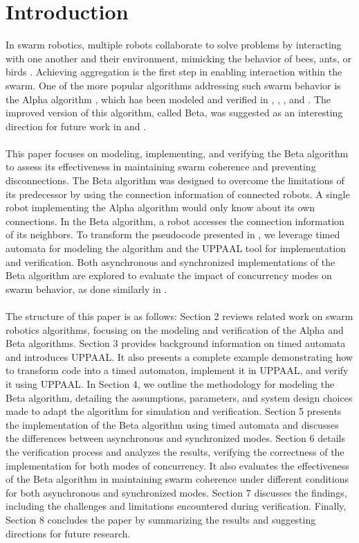\section{Introduction}
In swarm robotics, multiple robots collaborate to solve problems by interacting with one another and their environment, mimicking the behavior of bees, ants, or birds \cite{Shranz2020}. Achieving aggregation is the first step in enabling interaction within the swarm. One of the more popular algorithms addressing such swarm behavior is the Alpha algorithm \cite{Nembrini2002}, which has been modeled and verified in \cite{Winfield2005}, \cite{Sheshkalani2018}, \cite{Dixon2011}, and \cite{Dixon2015}. The improved version of this algorithm, called Beta, was suggested as an interesting direction for future work in \cite{Dixon2011} and \cite{Dixon2015}.
\\\\
This paper focuses on modeling, implementing, and verifying the Beta algorithm to assess its effectiveness in maintaining swarm coherence and preventing disconnections. The Beta algorithm was designed to overcome the limitations of its predecessor by using the connection information of connected robots. A single robot implementing the Alpha algorithm would only know about its own connections. In the Beta algorithm, a robot accesses the connection information of its neighbors. To transform the pseudocode presented in \cite{Nembrini2002}, we leverage timed automata for modeling the algorithm and the UPPAAL tool for implementation and verification. Both asynchronous and synchronized implementations of the Beta algorithm are explored to evaluate the impact of concurrency modes on swarm behavior, as done similarly in \cite{Dixon2011}.
\\\\
The structure of this paper is as follows: Section 2 reviews related work on swarm robotics algorithms, focusing on the modeling and verification of the Alpha and Beta algorithms. Section 3 provides background information on timed automata and introduces UPPAAL. It also presents a complete example demonstrating how to transform code into a timed automaton, implement it in UPPAAL, and verify it using UPPAAL. In Section 4, we outline the methodology for modeling the Beta algorithm, detailing the assumptions, parameters, and system design choices made to adapt the algorithm for simulation and verification. Section 5 presents the implementation of the Beta algorithm using timed automata and discusses the differences between asynchronous and synchronized modes. Section 6 details the verification process and analyzes the results, verifying the correctness of the implementation for both modes of concurrency. It also evaluates the effectiveness of the Beta algorithm in maintaining swarm coherence under different conditions for both asynchronous and synchronized modes. Section 7 discusses the findings, including the challenges and limitations encountered during verification. Finally, Section 8 concludes the paper by summarizing the results and suggesting directions for future research.
